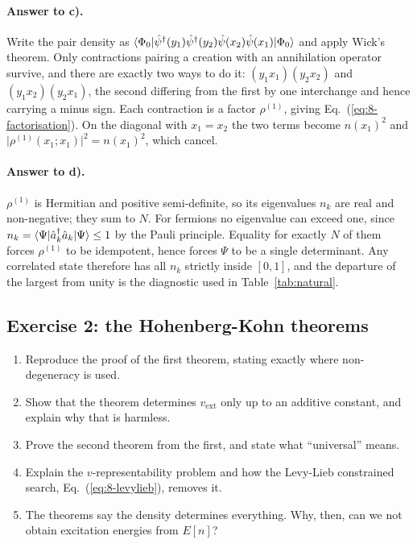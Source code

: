 \paragraph{Answer to c).}
Write the pair density as
$\langle \Phi_0 | \hat{\psi}^{\dagger}(y_1)\hat{\psi}^{\dagger}(y_2)
\hat{\psi}(x_2)\hat{\psi}(x_1) | \Phi_0 \rangle$ and apply Wick's theorem.  Only
contractions pairing a creation with an annihilation operator survive, and
there are exactly two ways to do it: $(y_1x_1)(y_2x_2)$ and
$(y_1x_2)(y_2x_1)$, the second differing from the first by one interchange
and hence carrying a minus sign.  Each contraction is a factor
$\rho^{(1)}$, giving Eq.~(\ref{eq:8-factorisation}).  On the diagonal with
$x_1=x_2$ the two terms become $n(x_1)^2$ and $\vert\rho^{(1)}(x_1;x_1)
\vert^2=n(x_1)^2$, which cancel.

\paragraph{Answer to d).}
$\rho^{(1)}$ is Hermitian and positive semi-definite, so its eigenvalues
$n_k$ are real and non-negative; they sum to $N$.  For fermions no eigenvalue
can exceed one, since $n_k=\langle \Psi | \hat{a}^{\dagger}_k\hat{a}_k | \Psi \rangle
\le1$ by the Pauli principle.  Equality for exactly $N$ of them forces
$\rho^{(1)}$ to be idempotent, hence forces $\Psi$ to be a single
determinant.  Any correlated state therefore has all $n_k$ strictly inside
$[0,1]$, and the departure of the largest from unity is the diagnostic used
in Table~\ref{tab:natural}.

\subsection*{Exercise 2: the Hohenberg-Kohn theorems}
\label{ex:8-hk}

\begin{enumerate}
  \item[a)] Reproduce the proof of the first theorem, stating exactly where
  non-degeneracy is used.
  \item[b)] Show that the theorem determines $v_{\mathrm{ext}}$ only up to an
  additive constant, and explain why that is harmless.
  \item[c)] Prove the second theorem from the first, and state what
  ``universal'' means.
  \item[d)] Explain the $v$-representability problem and how the Levy-Lieb
  constrained search, Eq.~(\ref{eq:8-levylieb}), removes it.
  \item[e)] The theorems say the density determines everything.  Why, then,
  can we not obtain excitation energies from $E[n]$?
\end{enumerate}

